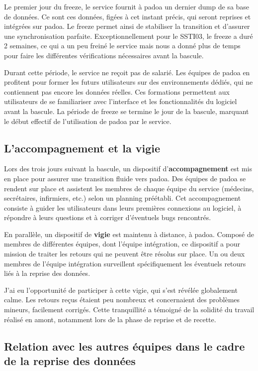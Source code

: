 Le premier jour du freeze, le service fournit à padoa un dernier dump de sa base de données. Ce sont ces données, figées à cet instant précis, qui seront reprises et intégrées sur padoa. Le freeze permet ainsi de stabiliser la transition et d’assurer une synchronisation parfaite.
Exceptionnellement pour le SSTI03, le freeze a duré 2 semaines, ce qui a un peu freiné le service mais nous a donné plus de temps pour faire les différentes vérifications nécessaires avant la bascule.

Durant cette période, le service ne reçoit pas de salarié. Les équipes de padoa en profitent pour former les futurs utilisateurs sur des environnements dédiés, qui ne contiennent pas encore les données réelles. Ces formations permettent aux utilisateurs de se familiariser avec l’interface et les fonctionnalités du logiciel avant la bascule. La période de freeze se termine le jour de la bascule, marquant le début effectif de l’utilisation de padoa par le service.

\subsection{L'accompagnement et la vigie}

Lors des trois jours suivant la bascule, un dispositif d’\textbf{accompagnement} est mis en place pour assurer une transition fluide vers padoa. Des équipes de padoa se rendent sur place et assistent les membres de chaque équipe du service (médecins, secrétaires, infirmiers, etc.) selon un planning préétabli. Cet accompagnement consiste à guider les utilisateurs dans leurs premières connexions au logiciel, à répondre à leurs questions et à corriger d’éventuels bugs rencontrés.

En parallèle, un dispositif de \textbf{vigie} est maintenu à distance, à padoa. Composé de membres de différentes équipes, dont l’équipe intégration, ce dispositif a pour mission de traiter les retours qui ne peuvent être résolus sur place. Un ou deux membres de l’équipe intégration surveillent spécifiquement les éventuels retours liés à la reprise des données. 

J’ai eu l’opportunité de participer à cette vigie, qui s’est révélée globalement calme. Les retours reçus étaient peu nombreux et concernaient des problèmes mineurs, facilement corrigés. Cette tranquillité a témoigné de la solidité du travail réalisé en amont, notamment lors de la phase de reprise et de recette.


\subsection{Relation avec les autres équipes dans le cadre de la reprise des données}

